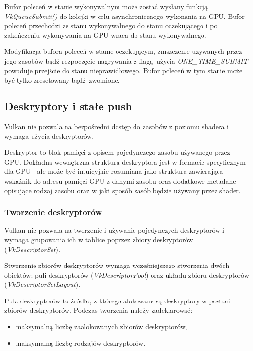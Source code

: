 Bufor poleceń w stanie wykonywalnym może zostać wysłany funkcją \textit{VkQueueSubmit()} do kolejki w celu asynchronicznego wykonania na GPU.
Bufor poleceń przechodzi ze stanu wykonywalnego do stanu oczekującego i po zakończeniu wykonywania na GPU wraca do stanu wykonywalnego.

Modyfikacja bufora poleceń w stanie oczekującym, zniszczenie używanych przez jego zasobów bądź rozpoczęcie nagrywania z flagą użycia \textit{ONE\_TIME\_SUBMIT} powoduje przejście do stanu nieprawidłowego.
Bufor poleceń w tym stanie może być tylko zresetowany bądź zwolnione.



\subsection{Deskryptory i stałe push}

Vulkan nie pozwala na bezpośredni dostęp do zasobów z poziomu shadera i wymaga użycia deskryptorów.

Deskryptor to blok pamięci z opisem pojedynczego zasobu używanego przez GPU. Dokładna wewnętrzna struktura deskryptora jest w formacie specyficznym dla GPU \cite{DESCRIPTORSHARD}, ale może być intuicyjnie rozumiana jako struktura zawierająca wskaźnik do adresu pamięci GPU z danymi zasobu oraz dodatkowe metadane opisujące rodzaj zasobu oraz w jaki sposób zasób będzie używany przez shader.

\subsubsection{Tworzenie deskryptorów}

Vulkan nie pozwala na tworzenie i używanie pojedynczych deskryptorów i wymaga grupowania ich w tablice poprzez zbiory deskryptorów (\textit{VkDescriptorSet}).

Stworzenie zbiorów deskryptorów wymaga wcześniejszego stworzenia dwóch obiektów: puli deskryptorów (\textit{VkDescriptorPool})
oraz układu zbioru deskryptorów (\textit{VkDescriptorSetLayout}).

Pula deskryptorów to źródło, z którego alokowane są deskryptory w postaci zbiorów deskryptorów. Podczas tworzenia należy zadeklarować:
\begin{itemize}
	\item maksymalną liczbę zaalokowanych zbiorów deskryptorów,
	\item maksymalną liczbę rodzajów deskryptorów.
\end{itemize}

